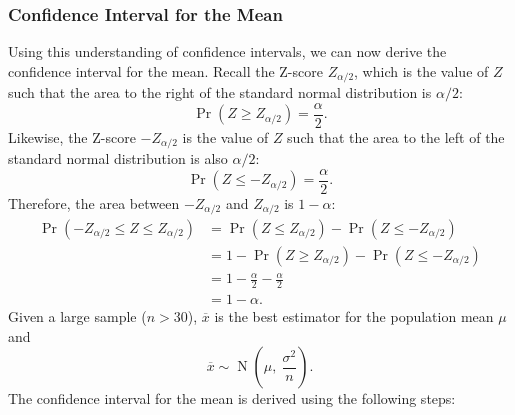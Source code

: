 \documentclass{article}
\begin{document}
\subsubsection{Confidence Interval for the Mean}
Using this understanding of confidence intervals, we can now derive the
confidence interval for the mean. Recall the Z-score \(Z_{\alpha/2}\),
which is the value of \(Z\) such that the area to the right of the
standard normal distribution is \(\alpha/2\):
\begin{equation*}
    \Pr{\left( Z \geq Z_{\alpha/2} \right)} = \frac{\alpha}{2}.
\end{equation*}
Likewise, the Z-score \(-Z_{\alpha/2}\) is the value of \(Z\) such that
the area to the left of the standard normal distribution is also
\(\alpha/2\):
\begin{equation*}
    \Pr{\left( Z \leq -Z_{\alpha/2} \right)} = \frac{\alpha}{2}.
\end{equation*}
Therefore, the area between \(-Z_{\alpha/2}\) and \(Z_{\alpha/2}\) is
\(1 - \alpha\):
\begin{align*}
    \Pr{\left( -Z_{\alpha/2} \leq Z \leq Z_{\alpha/2} \right)} & = \Pr{\left( Z \leq Z_{\alpha/2} \right)} - \Pr{\left( Z \leq -Z_{\alpha/2} \right)}     \\
                                                               & = 1 - \Pr{\left( Z \geq Z_{\alpha/2} \right)} - \Pr{\left( Z \leq -Z_{\alpha/2} \right)} \\
                                                               & = 1 - \frac{\alpha}{2} - \frac{\alpha}{2}                                                \\
                                                               & = 1 - \alpha.
\end{align*}
Given a large sample (\(n > 30\)), \(\overline{x}\) is the best
estimator for the population mean \(\mu\) and
\begin{equation*}
    \overline{x} \sim \operatorname{N}\left( \mu,\: \frac{\sigma^2}{n} \right).
\end{equation*}
The confidence interval for the mean is derived using the following steps:
\end{document}
